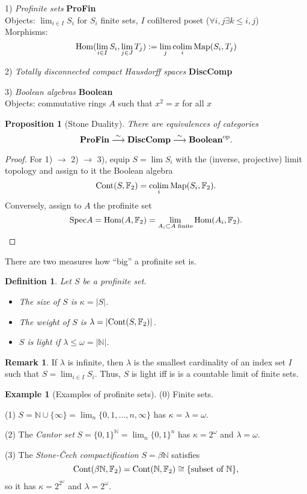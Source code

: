 \documentclass[12pt,a4paper]{amsart}
\newtheorem{prop}[PARA]{Proposition}
\newtheorem{defi}[PARA]{Definition}
\theoremstyle{definition}
\newtheorem{rem}[PARA]{Remark}
\theoremstyle{theorem}
\newtheorem{example}[PARA]{Example}
\newcommand{\F}{{\mathbb{F}}}
\newcommand{\N}{{\mathbb{N}}}
\DeclareMathOperator*{\colim}{colim}
\newcommand{\Hom}{\mathrm{Hom}}
\newcommand{\om}{{\omega}}
\newcommand{\Spec}{{\rm Spec}}
\newcommand{\Cont}{{\rm Cont}}
\newcommand{\Map}{{\rm Map}}
\begin{document}
1) {\em Profinite sets} {\bf ProFin} \\
Objects: $\lim_{i\in I}S_i$ for $S_i$ finite sets, $I$ cofiltered poset
($\forall i,j \exists k\leq i,j$)
\\
Morphisms: 
$$
  \Hom(\lim_{i\in I}S_i,\lim_{j\in J}T_j) := \lim_j\colim_i\Map(S_i,T_j)
$$

2) {\em Totally disconnected compact Hausdorff spaces} {\bf DiscComp}

3) {\em Boolean algebras} {\bf Boolean} \\ 
Objects: commutative rings $A$ such that $x^2=x$ for all $x$ 

\begin{prop}[Stone Duality]
There are equivalences of categories
$$
  \textbf{ProFin} \stackrel{\sim}\longrightarrow 
  \textbf{DiscComp} \stackrel{\sim}\longrightarrow  
  \textbf{Boolean}^{\rm op}.
$$
\end{prop}

\begin{proof}
For 1) $\to$ 2) $\to$ 3), equip $S=\lim S_i$ with the (inverse,
projective) limit topology and assign to it the Boolean algebra
$$
   \Cont(S,\F_2) = \colim_i\Map(S_i,\F_2).
$$
Conversely, assign to $A$ the profinite set
$$
  \Spec A = \Hom(A,\F_2) = \lim_{A_i\subset A\text{ finite}}\Hom(A_i,\F_2).
$$
\end{proof}

There are two measures how ``big'' a profinite set is.

\begin{defi}
Let $S$ be a profinite set. 
\begin{itemize}
\item The {\em size} of $S$ is $\kappa=|S|$.
\item The {\em weight} of $S$ is $\lambda=|\Cont(S,\F_2)|$.
\item $S$ is {\em light} if $\lambda\leq\om=|\N|$.
\end{itemize}
\end{defi}

\begin{rem}
If $\lambda$ is infinite, then $\lambda$ is the smallest
  cardinality of an index set $I$ such that $S=\lim_{i\in I}S_i$.
Thus, $S$ is light iff is is a countable limit of finite sets.
\end{rem}

\begin{example}[Examples of profinite sets]
(0) Finite sets.
  
(1) $S = \N\cup\{\infty\} = \lim_n\{0,1,\dots,n,\infty\}$ has $\kappa=\lambda=\om$. 

(2) The {\em Cantor set} $S = \{0,1\}^\N = \lim_n\{0,1\}^n$ has
  $\kappa=2^\om$ and $\lambda=\om$.

(3) The {\em Stone-\v{C}ech compactification} $S=\beta\N$ satisfies 
$$
  \Cont(\beta\N,\F_2) = \Cont(\N,\F_2) \cong \{\text{subset of }\N\},
$$
so it has $\kappa=2^{2^\om}$ and $\lambda=2^\om$. 
\end{example}
\end{document}
